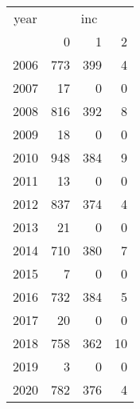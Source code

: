 \footnotesize\begin{tabular}[t]{lrrr}
\toprule
\multicolumn{1}{c}{year} & \multicolumn{3}{c}{inc} \\
\cmidrule(l{3pt}r{3pt}){1-1} \cmidrule(l{3pt}r{3pt}){2-4}
  & 0 & 1 & 2\\
\midrule
2006 & 773 & 399 & 4\\
2007 & 17 & 0 & 0\\
2008 & 816 & 392 & 8\\
2009 & 18 & 0 & 0\\
2010 & 948 & 384 & 9\\
2011 & 13 & 0 & 0\\
2012 & 837 & 374 & 4\\
2013 & 21 & 0 & 0\\
2014 & 710 & 380 & 7\\
2015 & 7 & 0 & 0\\
2016 & 732 & 384 & 5\\
2017 & 20 & 0 & 0\\
2018 & 758 & 362 & 10\\
2019 & 3 & 0 & 0\\
2020 & 782 & 376 & 4\\
\bottomrule
\end{tabular}
